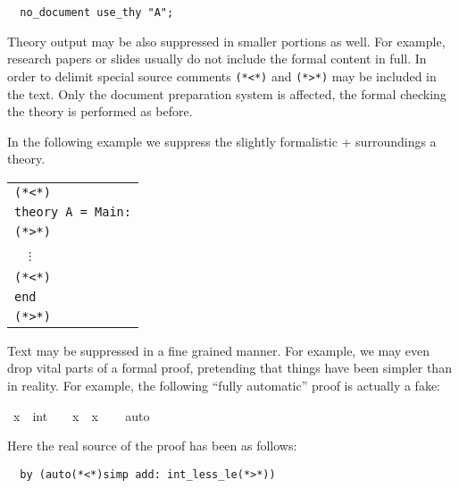\begin{isabellebody}
\begin{isamarkuptext}
\begin{verbatim}
  no_document use_thy "A";
\end{verbatim}

  \medskip Theory output may be also suppressed in smaller portions as
  well.  For example, research papers or slides usually do not include
  the formal content in full.  In order to delimit  special source comments
  \verb,(,\verb,*,\verb,<,\verb,*,\verb,), and
  \verb,(,\verb,*,\verb,>,\verb,*,\verb,), may be included in the
  text.  Only the document preparation system is affected, the formal
  checking the theory is performed as before.

  In the following example we suppress the slightly formalistic
   +  surroundings a theory.

  \medskip

  \begin{tabular}{l}
  \verb,(,\verb,*,\verb,<,\verb,*,\verb,), \\
  \texttt{theory A = Main:} \\
  \verb,(,\verb,*,\verb,>,\verb,*,\verb,), \\
  ~~$\vdots$ \\
  \verb,(,\verb,*,\verb,<,\verb,*,\verb,), \\
  \texttt{end} \\
  \verb,(,\verb,*,\verb,>,\verb,*,\verb,), \\
  \end{tabular}

  \medskip

  Text may be suppressed in a fine grained manner.  For example, we
  may even drop vital parts of a formal proof, pretending that things
  have been simpler than in reality.  For example, the following
  ``fully automatic'' proof is actually a fake:%
\end{isamarkuptext}%
\isamarkuptrue%
\ {\isachardoublequote}x\ {\isasymnoteq}\ {\isacharparenleft}{}{\isacharcolon}{\isacharcolon}int{\isacharparenright}\ {\isasymLongrightarrow}\ {}\ {\isacharless}\ x\ {\isacharasterisk}\ x{\isachardoublequote}\isanewline
\ \ \isamarkupfalse%
\ {\isacharparenleft}auto{\isacharparenright}\isamarkupfalse%
%
\begin{isamarkuptext}%
\noindent Here the real source of the proof has been as follows:

\begin{verbatim}
  by (auto(*<*)simp add: int_less_le(*>*))
\end{verbatim} %


\end{isamarkuptext}
\end{isabellebody}
